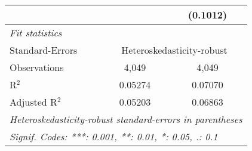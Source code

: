 \begin{tabular}{lcc}
                                         &                 & (0.1012)\\   
   \midrule
   \emph{Fit statistics}\\
   Standard-Errors & \multicolumn{2}{c}{Heteroskedasticity-robust} \\ 
   Observations                          & 4,049           & 4,049\\  
   R$^2$                                 & 0.05274         & 0.07070\\  
   Adjusted R$^2$                        & 0.05203         & 0.06863\\  
   \midrule \midrule
   \multicolumn{3}{l}{\emph{Heteroskedasticity-robust standard-errors in parentheses}}\\
   \multicolumn{3}{l}{\emph{Signif. Codes: ***: 0.001, **: 0.01, *: 0.05, .: 0.1}}\\
\end{tabular}
\par\endgroup


